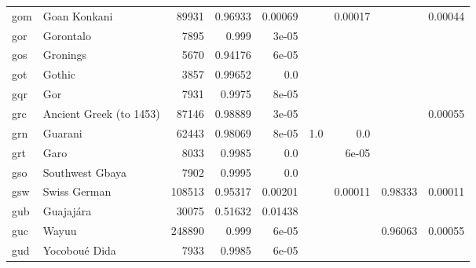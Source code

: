 \documentclass[11pt]{article}
\begin{document}
\begin{table*}[h]
{\begin{tabular}{llrrrrrrr}
gom         & Goan Konkani         & 89931         & 0.96933         & 0.00069         &          & 0.00017         &          & 0.00044         \\

gor         & Gorontalo         & 7895         & 0.999         & 3e-05         &          &          &          &          \\

gos         & Gronings         & 5670         & 0.94176         & 6e-05         &          &          &          &          \\

got         & Gothic         & 3857         & 0.99652         & 0.0         &          &          &          &          \\

gqr         & Gor         & 7931         & 0.9975         & 8e-05         &          &          &          &          \\

grc         & Ancient Greek (to 1453)         & 87146         & 0.98889         & 3e-05         &          &          &          & 0.00055         \\

grn         & Guarani         & 62443         & 0.98069         & 8e-05         & 1.0         & 0.0         &          &          \\

grt         & Garo         & 8033         & 0.9985         & 0.0         &          & 6e-05         &          &          \\

gso         & Southwest Gbaya         & 7902         & 0.9995         & 0.0         &          &          &          &          \\

gsw         & Swiss German         & 108513         & 0.95317         & 0.00201         &          & 0.00011         & 0.98333         & 0.00011         \\

gub         & Guajajára         & 30075         & 0.51632         & 0.01438         &          &          &          &          \\

guc         & Wayuu         & 248890         & 0.999         & 6e-05         &          &          & 0.96063         & 0.00055         \\

gud         & Yocoboué Dida         & 7933         & 0.9985         & 6e-05         &          &          &          &          \\


\end{tabular}}
\end{table*}
\end{document}
